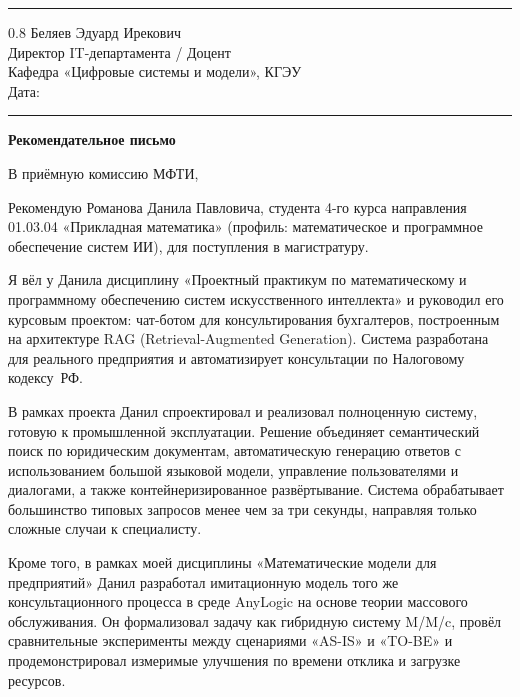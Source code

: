 \documentclass[a4paper,12pt]{article}
\begin{document}
\vspace{4pt}
\noindent\rule{\textwidth}{0.8pt}

\begin{flushright}
  \begin{spacing}{0.8}
    Беляев Эдуард Ирекович\\
    Директор IT-департамента / Доцент\\
    Кафедра «Цифровые системы и модели», КГЭУ\\[6pt]
    Дата: \rule{4cm}{0.4pt}
  \end{spacing}
\end{flushright}

\begin{center}
  {\Large\bfseries Рекомендательное письмо}
\end{center}

В приёмную комиссию МФТИ,

Рекомендую Романова Данила Павловича, студента 4-го курса направления 01.03.04 «Прикладная математика» (профиль: ма\-те\-ма\-ти\-че\-ское и про\-грамм\-ное обес\-пе\-че\-ние систем ИИ), для по\-сту\-пле\-ния в ма\-ги\-стра\-ту\-ру.

Я вёл у Данила дисциплину «Проектный практикум по математическому и программному обеспечению систем искусственного интеллекта» и руководил его курсовым проектом: чат-ботом для консультирования бухгалтеров, построенным на архитектуре RAG (Retrieval-Augmented Generation). Система разработана для реального предприятия и автоматизирует консультации по Налоговому кодексу~РФ.

В рамках проекта Данил спроектировал и реализовал полноценную систему, готовую к промышленной эксплуатации. Решение объединяет семантический поиск по юридическим документам, автоматическую генерацию ответов с использованием большой языковой модели, управление пользователями и диалогами, а также контейнеризированное развёртывание. Система обрабатывает большинство типовых запросов менее чем за три секунды, направляя только сложные случаи к специалисту.

Кроме того, в рамках моей дисциплины «Математические модели для предприятий» Данил разработал имитационную модель того же консультационного процесса в среде AnyLogic на основе теории массового обслуживания. Он формализовал задачу как гибридную систему M/M/c, провёл сравнительные эксперименты между сценариями «AS-IS» и «TO-BE» и продемонстрировал измеримые улучшения по времени отклика и загрузке ресурсов.
\end{document}
